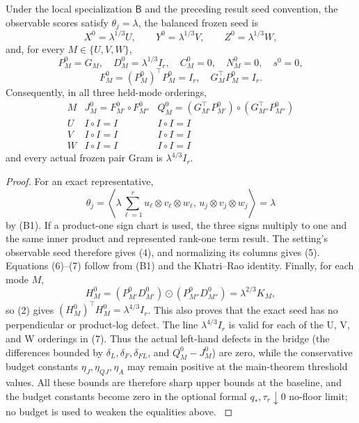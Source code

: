 \begin{lemma}\label{lem:step-013-baseline-geometry}
Under the local
specialization \(\mathsf B\) and the preceding result seed convention, the
observable scores satisfy \(\theta_j=\lambda\), the balanced frozen seed is
\[
X^0=\lambda^{1/3}U,\qquad Y^0=\lambda^{1/3}V,\qquad
Z^0=\lambda^{1/3}W,
\tag{4}
\]
and, for every \(M\in\{U,V,W\}\),
\[
P_M^0=G_M,\quad D_M^0=\lambda^{1/3}I_r,\quad
C_M^0=0,\quad N_M^0=0,\quad s^0=0,
\tag{5}
\]
\[
F_M^0=(P_M^0)^\top P_M^0=I_r,\quad
G_M^\top P_M^0=I_r.
\tag{6}
\]
Consequently, in all three held-mode orderings,
\[
\begin{array}{c|c|c}
M & J_M^0=F_{M'}^0\circ F_{M''}^0 &
Q_M^0=(G_{M'}^\top P_{M'}^0)\circ(G_{M''}^\top P_{M''}^0)\\ \hline
U & I\circ I=I & I\circ I=I\\
V & I\circ I=I & I\circ I=I\\
W & I\circ I=I & I\circ I=I
\end{array}
\tag{7}
\]
and every actual frozen pair Gram is \(\lambda^{4/3}I_r\).

\begin{proof}
For an exact representative,
\[
\theta_j=\left\langle
\lambda\sum_{\ell=1}^r u_\ell\otimes v_\ell\otimes w_\ell,\,
u_j\otimes v_j\otimes w_j\right\rangle
=\lambda
\tag{8}
\]
by (B1). If a product-one sign chart is used, the three signs multiply to
one and the same inner product and represented rank-one term result. The
setting's observable seed therefore gives (4), and normalizing its columns
gives (5). Equations (6)--(7) follow from (B1) and the Khatri--Rao identity.
Finally, for each mode \(M\),
\[
H_M^0=(P_{M'}^0D_{M'}^0)\odot(P_{M''}^0D_{M''}^0)
=\lambda^{2/3}K_M,
\tag{9}
\]
so (2) gives \((H_M^0)^\top H_M^0=\lambda^{4/3}I_r\). This also proves
that the exact seed has no perpendicular or product-log defect. The line
\(\lambda^{4/3}I_r\) is valid for each of the U, V, and W orderings in (7).
Thus the actual left-hand defects in the bridge (the differences bounded by
\(\delta_L,\delta_F,\delta_{FL}\), and \(Q_M^0-J_M^0\)) are zero, while the
conservative budget constants \(\eta_J,\eta_{QJ},\eta_A\) may remain positive
at the main-theorem threshold values. All these bounds are therefore sharp
upper bounds at the baseline, and the budget constants become zero in the
optional formal \(q_*,\tau_r\downarrow0\) no-floor limit; no budget is used
to weaken the equalities above.
\(\)


\end{proof}
\end{lemma}
